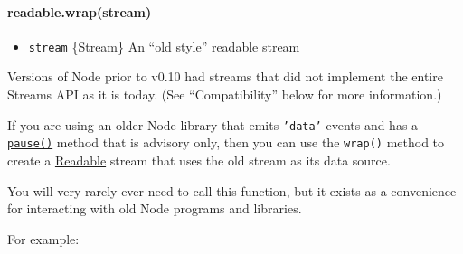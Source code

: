 \begin{Shaded}
\begin{Highlighting}[]
        \NormalTok{(}
        \NormalTok{(}
      \NormalTok{\} } \NormalTok{\{}
      \NormalTok{\}}
    \NormalTok{\}}
  \NormalTok{\}}
\NormalTok{\}}
\end{Highlighting}
\end{Shaded}

\paragraph{readable.wrap(stream)}

\begin{itemize}
\item
  \texttt{stream} \{Stream\} An ``old style'' readable stream
\end{itemize}

Versions of Node prior to v0.10 had streams that did not implement the
entire Streams API as it is today. (See ``Compatibility'' below for more
information.)

If you are using an older Node library that emits \texttt{'data'} events
and has a \hyperref[stream\_readable\_pause]{\texttt{pause()}} method
that is advisory only, then you can use the \texttt{wrap()} method to
create a \hyperref[stream\_class\_stream\_readable]{Readable} stream
that uses the old stream as its data source.

You will very rarely ever need to call this function, but it exists as a
convenience for interacting with old Node programs and libraries.

For example:

\begin{Shaded}
\begin{Highlighting}[]
 \NormalTok{;}
  
 \NormalTok{;}
  

\NormalTok{(}\NormalTok{, }\NormalTok{() \{}
  \NormalTok{(); }
\NormalTok{\});}
\end{Highlighting}
\end{Shaded}

